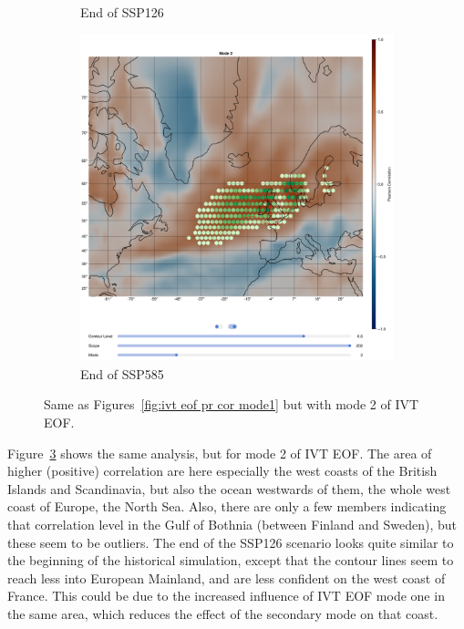 \begin{figure}[!htb]
\begin{subfigure}[b]{0.32\textwidth}
    \caption{End of SSP126} 
    \label{fig:ivt eof pr cor ssp126 mode2}
  \end{subfigure}
  \begin{subfigure}[b]{0.32\textwidth}
    \includegraphics[width=\textwidth]{figures/ivt_pr_cor_mode2_ssp585_hexbin.png}
    \caption{End of SSP585}
    \label{fig:ivt eof pr cor ssp585 mode2}
  \end{subfigure}
  \caption{Same as Figures~\ref{fig:ivt eof pr cor mode1} but with mode 2 of IVT EOF.}
  \label{fig:ivt eof pr cor mode2}
\end{figure}

Figure~\ref{fig:ivt eof pr cor mode2} shows the same analysis, but for mode 2 of IVT EOF. 
The area of higher (positive) correlation are here especially the west coasts of the British Islands and Scandinavia, but also the ocean westwards of them, the whole west coast of Europe, the North Sea. 
Also, there are only a few members indicating that correlation level in the Gulf of Bothnia (between Finland and Sweden), but these seem to be outliers. 
The end of the SSP126 scenario looks quite similar to the beginning of the historical simulation, except that the contour lines seem to reach less into European Mainland, and are less confident on the west coast of France.  
This could be due to the increased influence of IVT EOF mode one in the same area, which reduces the effect of the secondary mode on that coast. 


